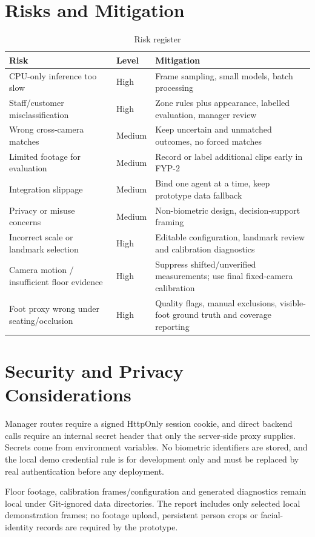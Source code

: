 \section{Risks and Mitigation}
\begin{table}[H]
\centering
\caption{Risk register}
\begin{tabular}{P{0.3\textwidth}P{0.1\textwidth}P{0.4\textwidth}}
\toprule
Risk & Level & Mitigation\\
\midrule
CPU-only inference too slow & High & Frame sampling, small models, batch processing\\
Staff/customer misclassification & High & Zone rules plus appearance, labelled evaluation, manager review\\
Wrong cross-camera matches & Medium & Keep uncertain and unmatched outcomes, no forced matches\\
Limited footage for evaluation & Medium & Record or label additional clips early in FYP-2\\
Integration slippage & Medium & Bind one agent at a time, keep prototype data fallback\\
Privacy or misuse concerns & Medium & Non-biometric design, decision-support framing\\
Incorrect scale or landmark selection & High & Editable configuration, landmark review and calibration diagnostics\\
Camera motion / insufficient floor evidence & High & Suppress shifted/unverified measurements; use final fixed-camera calibration\\
Foot proxy wrong under seating/occlusion & High & Quality flags, manual exclusions, visible-foot ground truth and coverage reporting\\
\bottomrule
\end{tabular}
\end{table}

\section{Security and Privacy Considerations}
Manager routes require a signed HttpOnly session cookie, and direct backend calls require an internal secret header that only the server-side proxy supplies. Secrets come from environment variables. No biometric identifiers are stored, and the local demo credential rule is for development only and must be replaced by real authentication before any deployment.

Floor footage, calibration frames/configuration and generated diagnostics remain local under Git-ignored data directories. The report includes only selected local demonstration frames; no footage upload, persistent person crops or facial-identity records are required by the prototype.

